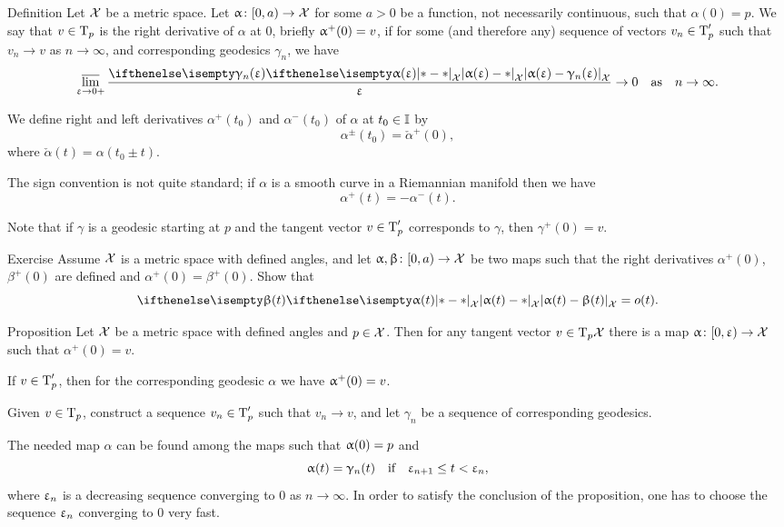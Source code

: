 \begin{thm}{Definition}\label{def:right-derivative}
Let $\mathcal{X}$ be a metric space.
Let $\alpha\:[0,a)\to \spc{X}$ for some $a>0$ be a function, not necessarily continuous, such that $\alpha(0)=p$.
We say that $v\in\T_p$ is the right derivative of $\alpha$ at $0$,
briefly $\alpha^+(0)\z=v$, if for some (and therefore any) sequence of vectors $v_n\in\T'_p$ such that $v_n\to v$ as $n\to\infty$,
and corresponding geodesics $\gamma_n$, 
we have 
\[\limsup_{\eps\to0+}\frac{\dist{\alpha(\eps)}{\gamma_n(\eps)}{\spc{X}}}{\eps}\to 0\quad \text{as}\quad n\to\infty.\]

We define right and left derivatives $\alpha^+(t_0)$ and $\alpha^-(t_0)$
of $\alpha$ at $t_0\in\II$ by 
\[\alpha^\pm(t_0)=\check\alpha^+(0),\] where $\check\alpha(t)=\alpha(t_0\pm t)$.
\end{thm}

The sign convention is not quite standard; if $\alpha$ is a smooth curve in a Riemannian manifold then we have
\[\alpha^+(t)=-\alpha^-(t).\]

Note that if $\gamma$ is a geodesic starting at $p$ 
and the tangent vector $v\in\T_p'$ corresponds to $\gamma$, 
then $\gamma^+(0)=v$.

\begin{thm}{Exercise}\label{ex:tangent-vect=o(t)}
Assume $\mathcal{X}$ is a metric space with defined angles,
and let $\alpha,\beta\:[0,a)\to\spc{X}$ 
be two maps such that the right derivatives $\alpha^+(0)$, $\beta^+(0)$ are defined and $\alpha^+(0)=\beta^+(0)$.
Show that
\[\dist{\alpha(t)}{\beta(t)}{\spc{X}}=o(t).\]
\end{thm}

\begin{thm}{Proposition}
Let $\mathcal{X}$ be a metric space with defined angles and $p\in \spc{X}$.
Then for any tangent vector $v\in\T_p\spc{X}$ there is a map $\alpha\:[0,\eps)\to \spc{X}$ such that $\alpha^+(0)=v$.
\end{thm}

If $v\in \T_p'$, then for the corresponding geodesic $\alpha$ we have $\alpha^+(0)\z=v$.

Given $v\in \T_p$, construct a sequence $v_n\in\T'_p$ 
such that $v_n\to v$, and let $\gamma_n$ be a sequence of corresponding geodesics.

The needed map $\alpha$ can be found among the maps such that $\alpha(0)\z=p$ and
\[\alpha(t)=\gamma_n(t)\quad \text{if}\quad \eps_{n+1}\le t<\eps_n,\]
where $\upvarepsilon_n$
is a decreasing sequence converging to $0$ as $n\to\infty$.
In order to satisfy the conclusion of the proposition, one has to choose the sequence $\upvarepsilon_n$ converging to $0$ very fast.
\qeds

